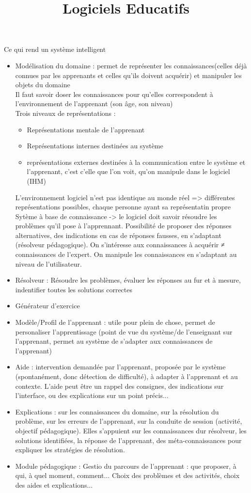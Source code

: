 \documentclass[11pt]{article}
\title{Logiciels Educatifs}
\begin{document}

Ce qui rend un système intelligent

\begin{itemize}
	\item Modélisation du domaine : permet de représenter les connaissances(celles déjà connues par les apprenants et celles qu'ils doivent acquérir) et manipuler les objets du domaine\\
	Il faut savoir doser les connaissances pour qu'elles correspondent à l'environnement de l'apprenant (son âge, son niveau)\\
	Trois niveaux de représentations :
	\begin{itemize}
		\item Représentations mentale de l'apprenant
		\item Représentations internes destinées au système
		\item représentations externes destinées à la communication entre le système et l'apprenant, c'est c'elle que l'on voit, qu'on manipule dans le logiciel (IHM)
	\end{itemize}
	L'environnement logiciel n'est pas identique au monde réel => différentes représentations possibles, chaque personne ayant sa représentatin propre\\
	Sytème à base de connaissance -> le logiciel doit savoir résoudre les problèmes qu'il pose à l'apprennant. Possibilité de proposer des réponses alternatives, des indications en cas de réponses fausses, en s'adaptant (résolveur pédagogique). On s'intéresse aux connaissances à acquérir ≠ connaissances de l'expert. On manipule les connaissances en s'adaptant au niveau de l'utilisateur.
	\item Résolveur : Résoudre les problèmes, évaluer les réponses au fur et à mesure, indentifier toutes les solutions correctes

	\item Générateur d'exercice
	\item Modèle/Profil de l'apprenant : utile pour plein de chose, permet de personaliser l'apprentissage (point de vue du système/de l'enseignant sur l'apprenant, permet au système de s'adapter aux connaissances de l'apprenant)
	\item Aide : intervention demandée par l'apprenant, proposée par le système (spontanément, donc détection de difficulté), à adapter à l'apprenant et au contexte. L'aide peut être un rappel des consignes, des indications sur l'interface, ou des explications sur un point précis...
	\item Explications : sur les connaissances du domaine, sur la résolution du problème, sur les erreurs de l'apprenant, sur la conduite de session (activité, objectif pédagogique). Elles s'appuient sur les connaissances dur résolveur, les solutions identifiées, la réponse de l'apprenant, des méta-connaissances pour expliquer les stratégies de résolution.
	\item Module pédagogique : Gestio du parcours de l'apprenant : que proposer, à qui, à quel moment, comment... Choix des problèmes et des activités, choix des aides et explications...


\end{itemize}
\end{document}
